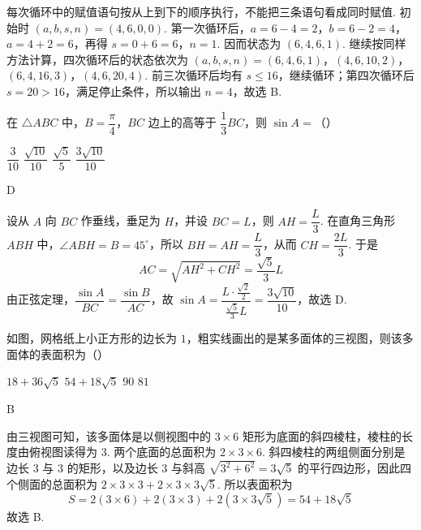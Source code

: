 \begin{solution}
每次循环中的赋值语句按从上到下的顺序执行，不能把三条语句看成同时赋值. 初始时 \((a,b,s,n)=(4,6,0,0)\). 第一次循环后，\(a=6-4=2\)，\(b=6-2=4\)，\(a=4+2=6\)，再得 \(s=0+6=6\)，\(n=1\). 因而状态为 \((6,4,6,1)\). 继续按同样方法计算，四次循环后的状态依次为
\((a,b,s,n)=(6,4,6,1)\)，\((4,6,10,2)\)，\((6,4,16,3)\)，\((4,6,20,4)\).
前三次循环后均有 \(s\le16\)，继续循环；第四次循环后 \(s=20>16\)，满足停止条件，所以输出 \(n=4\)，故选 B.
\end{solution}

\begin{problem}
在 \(\triangle ABC\) 中，\(B=\dfrac{\pi}{4}\)，\(BC\) 边上的高等于 \(\dfrac13 BC\)，则 \(\sin A=\)（\quad）

\choices
    {\(\dfrac{3}{10}\)}
    {\(\dfrac{\sqrt{10}}{10}\)}
    {\(\dfrac{\sqrt5}{5}\)}
    {\(\dfrac{3\sqrt{10}}{10}\)}
\end{problem}

\begin{answer}
D
\end{answer}

\begin{solution}
设从 \(A\) 向 \(BC\) 作垂线，垂足为 \(H\)，并设 \(BC=L\)，则 \(AH=\dfrac L3\). 在直角三角形 \(ABH\) 中，\(\angle ABH=B=45^\circ\)，所以 \(BH=AH=\dfrac L3\)，从而 \(CH=\dfrac{2L}{3}\). 于是
\[
AC=\sqrt{AH^2+CH^2}=\frac{\sqrt5}{3}L
\]
由正弦定理，\(\dfrac{\sin A}{BC}=\dfrac{\sin B}{AC}\)，故 \(\sin A=\dfrac{L\cdot\frac{\sqrt2}{2}}{\frac{\sqrt5}{3}L}=\dfrac{3\sqrt{10}}{10}\)，故选 D.
\end{solution}

\begin{problem}
如图，网格纸上小正方形的边长为 \(1\)，粗实线画出的是某多面体的三视图，则该多面体的表面积为（\quad）

\begingroup
{}
\endgroup

\choices
    {\(18+36\sqrt5\)}
    {\(54+18\sqrt5\)}
    {\(90\)}
    {\(81\)}
\end{problem}

\begin{answer}
B
\end{answer}

\begin{solution}
由三视图可知，该多面体是以侧视图中的 \(3\times6\) 矩形为底面的斜四棱柱，棱柱的长度由俯视图读得为 \(3\). 两个底面的总面积为 \(2\times3\times6\). 斜四棱柱的两组侧面分别是边长 \(3\) 与 \(3\) 的矩形，以及边长 \(3\) 与斜高
\(
\sqrt{3^2+6^2}=3\sqrt5
\)
的平行四边形，因此四个侧面的总面积为 \(2\times3\times3+2\times3\times3\sqrt5\). 所以表面积为
\[
S=2\left(3\times6\right)+2\left(3\times3\right)+2\left(3\times3\sqrt5\right)=54+18\sqrt5
\]
故选 B.
\end{solution}

